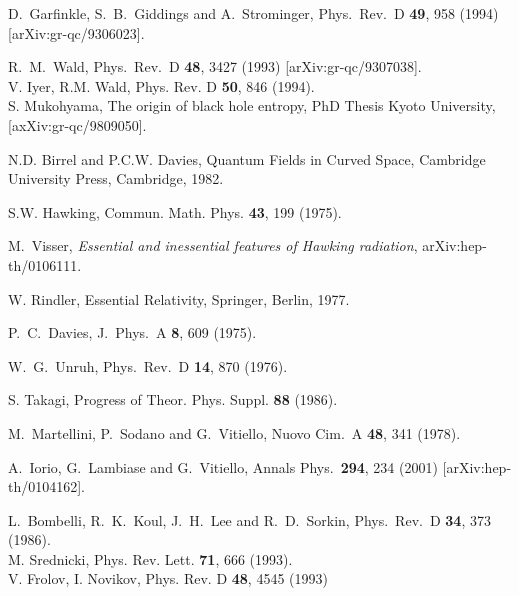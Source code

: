 \begin{thebibliography}{99}
D.~Garfinkle, S.~B.~Giddings and A.~Strominger,
Phys.\ Rev.\ D {\bf 49}, 958 (1994) [arXiv:gr-qc/9306023].

R.~M.~Wald,
Phys.\ Rev.\ D {\bf 48}, 3427 (1993) [arXiv:gr-qc/9307038].
             \\
               V. Iyer, R.M. Wald, Phys. Rev. D {\bf 50}, 846 (1994). \\
               S. Mukohyama, The origin of black hole entropy,
               PhD Thesis Kyoto University, [axXiv:gr-qc/9809050].

 N.D. Birrel and P.C.W. Davies, Quantum Fields
                  in Curved Space, Cambridge University Press,
                  Cambridge, 1982.

 S.W. Hawking, Commun. Math. Phys. {\bf 43}, 199 (1975).

M.~Visser, {\it Essential and inessential features of Hawking
radiation}, arXiv:hep-th/0106111.
%

 W. Rindler, Essential Relativity, Springer,
Berlin, 1977.

P.~C.~Davies,
J.\ Phys.\ A {\bf 8}, 609 (1975).

W.~G.~Unruh,
Phys.\ Rev.\ D {\bf 14}, 870 (1976).

 S. Takagi, Progress of Theor. Phys. Suppl. {\bf 88}
(1986).

M.~Martellini, P.~Sodano and G.~Vitiello,
Nuovo Cim.\ A {\bf 48}, 341 (1978).

A.~Iorio, G.~Lambiase and G.~Vitiello,
Annals Phys.\  {\bf 294}, 234 (2001)
[arXiv:hep-th/0104162].

L.~Bombelli, R.~K.~Koul, J.~H.~Lee and R.~D.~Sorkin,
Phys.\ Rev.\ D {\bf 34}, 373 (1986).
\\
M. Srednicki, Phys. Rev. Lett. {\bf 71}, 666 (1993). \\
V. Frolov, I. Novikov, Phys. Rev. D {\bf 48}, 4545 (1993)


\end{thebibliography}
